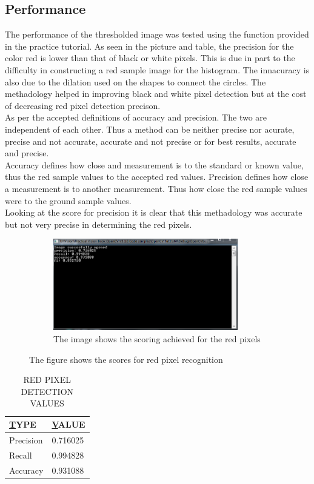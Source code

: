 \documentclass{article}
\begin{document}
\subsection{Performance}\label{sec:intro}
The performance of the thresholded image was tested using the function provided in the practice tutorial. As seen in the picture and table, the precision for the color red is lower than that of black or white pixels. This is due in part to the difficulty in constructing a red sample image for the histogram. The innacuracy is also due to the dilation used on the shapes to connect the circles. The methadology helped in improving black and white pixel detection but at the cost of decreasing red pixel detection precison.\\
As per the accepted definitions of accuracy and precision. The two are independent of each other. Thus a method can be neither precise nor acurate, precise and not accurate, accurate and not precise or for best results, accurate and precise.\\
Accuracy defines how close and measurement is to the standard or known value, thus the red sample values to the accepted red values. Precision defines how close  a measurement is to another measurement. Thus how close the red sample values were to the ground sample values.\\
Looking at the score for precision it is clear that this methadology was accurate but not very precise in determining the red pixels.\\

\begin{figure}[H]
\center
\begin{subfigure}{0.5\textwidth}
\includegraphics[width=0.9\linewidth, height=4cm]{N_RED_STAT.PNG} 
\caption{The image shows the scoring achieved for the red pixels}
\label{fig:subim2}
\end{subfigure}
\caption{The figure shows the scores for red pixel recognition}
\label{fig:image2}
\end{figure}

\begin{table}[]
\centering
\caption{RED PIXEL DETECTION VALUES}
\label{my-label}
\begin{tabular}{@{}|l|l|@{}}
\toprule
{\ul TYPE} & {\ul VALUE} \\ \midrule
Precision  & 0.716025    \\ \midrule
Recall     & 0.994828     \\ \midrule
Accuracy   & 0.931088    \\ \bottomrule
\end{tabular}
\end{table}
\end{document}
